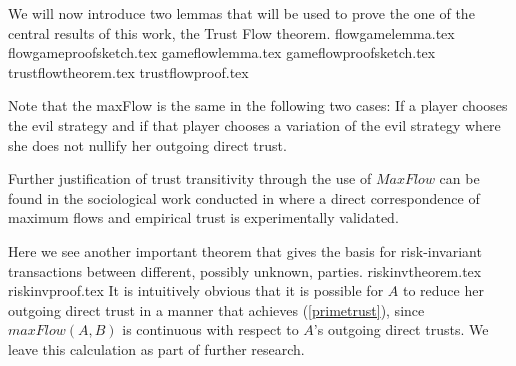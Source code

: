   We will now introduce two lemmas that will be used to prove the one of the central results of this work, the Trust Flow
  theorem.
  {flowgamelemma.tex}
  {flowgameproofsketch.tex}
  {gameflowlemma.tex}
  {gameflowproofsketch.tex}
  {trustflowtheorem.tex}
  {trustflowproof.tex}

  \noindent Note that the maxFlow is the same in the following two cases: If a player chooses the evil strategy and if that
  player chooses a variation of the evil strategy where she does not nullify her outgoing direct trust.

  Further justification of trust transitivity through the use of $MaxFlow$ can be found in the sociological work conducted in
  \cite{kmrs} where a direct correspondence of maximum flows and empirical trust is experimentally validated.

  Here we see another important theorem that gives the basis for risk-invariant transactions between different, possibly
  unknown, parties.
  {riskinvtheorem.tex}
  {riskinvproof.tex}
  \noindent It is intuitively obvious that it is possible for $A$ to reduce her outgoing direct trust in a manner that
  achieves (\ref{primetrust}), since $maxFlow\left(A, B\right)$ is continuous with respect to $A$'s outgoing direct trusts. We
  leave this calculation as part of further research.
